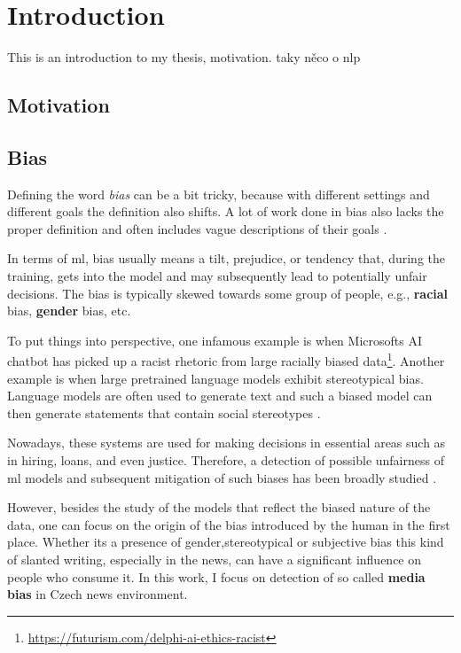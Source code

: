 \chapter{Introduction}
This is an introduction to my thesis, motivation. taky něco o nlp
\section{Motivation}

\section{Bias}
Defining the word \textit{bias} can be a bit tricky, because with different settings and different goals the definition also shifts. A lot of work done in bias also lacks the proper definition and often includes vague descriptions of their goals \cite{blodgett2020language}. 

In terms of \Gls{ml}, bias usually means a tilt, prejudice, or tendency that, during the training, gets into the model and may subsequently lead to potentially unfair decisions. The bias is typically skewed towards some group of people, e.g., \textbf{racial} bias, \textbf{gender} bias, etc. 

To put things into perspective, one infamous example is when Microsofts AI chatbot has picked up a racist rhetoric from large racially biased data\footnote{\url{https://futurism.com/delphi-ai-ethics-racist}}. Another example is when large pretrained language models exhibit stereotypical bias. Language models are often used to generate text and such a biased model can then generate statements that contain social stereotypes \cite{nadeem2021stereoset}.

Nowadays, these systems are used for making decisions in essential areas such as in hiring, loans, and even justice. Therefore, a detection of possible unfairness of \Gls{ml} models and subsequent mitigation of such biases has been broadly studied \cite{blodgett2020language}.

However, besides the study of the models that reflect the biased nature of the data, one can focus on the origin of the bias introduced by the human in the first place.
Whether its a presence of gender,stereotypical or subjective bias this 
kind of slanted writing, especially in the news, can have a significant influence on people who consume it. In this work, I focus on detection of so called \textbf{media bias} in Czech news environment.

\newpage
